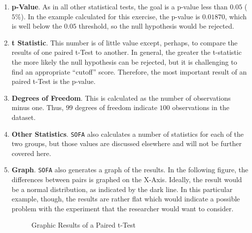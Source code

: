 \begin{enumerate}
  \item \textbf{p-Value}. As in all other statistical tests, the goal is a p-value less than $ 0.05 $ ($ 5\% $). In the example calculated for this exercise, the p-value is $ 0.01870 $, which is well below the $ 0.05 $ threshold, so the null hypothesis would be rejected.
  \item \textbf{t Statistic}. This number is of little value except, perhaps, to compare the results of one paired t-Test to another. In general, the greater the t-statistic the more likely the null hypothesis can be rejected, but it is challenging to find an appropriate ``cutoff'' score. Therefore, the most important result of an paired t-Test is the p-value.
  \item \textbf{Degrees of Freedom}. This is calculated as the number of observations minus one. Thus, $ 99 $ degrees of freedom indicate $ 100 $ observations in the dataset.
  \item \textbf{Other Statistics}. \texttt{SOFA} also calculates a number of statistics for each of the two groups, but those values are discussed elsewhere and will not be further covered here.
  \item \textbf{Graph}. \texttt{SOFA} also generates a graph of the results. In the following figure, the differences between pairs is graphed on the X-Axis. Ideally, the result would be a normal distribution, as indicated by the dark line. In this particular example, though, the results are rather flat which would indicate a possible problem with the experiment that the researcher would want to consider. 
  
  \begin{figure}[H]
    \begin{center}
      \caption{Graphic Results of a Paired t-Test}
    \end{center}
  \end{figure}
  
\end{enumerate}

